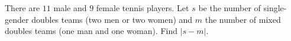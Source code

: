 There are $11$ male and $9$ female tennis players. Let $s$ be the number of single-gender doubles teams (two men or two women) and $m$ the number of mixed doubles teams (one man and one woman). Find $|s-m|$.
